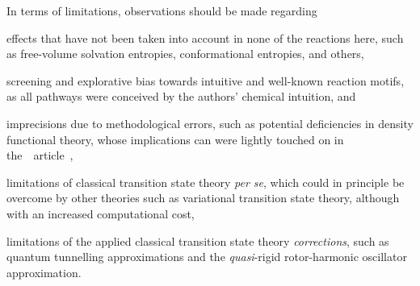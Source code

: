
In terms of limitations, observations should be made regarding
\begin{itemize*}
	\item effects that have not been taken into account in none of the reactions here,
	      such as free-volume solvation entropies, conformational entropies, and others,
	\item screening and explorative bias towards intuitive and well-known reaction motifs,
	      as all pathways were conceived by the authors' chemical intuition, and
	\item imprecisions due to methodological errors, such as potential deficiencies in density functional theory,
	      whose implications can were lightly touched on in the~\overreact{}~article~\cite{Schneider2022},
	\item limitations of classical transition state theory \emph{per se},
	      which could in principle be overcome by other theories such as variational transition state theory,
	      although with an increased computational cost,
	\item limitations of the applied classical transition state theory \emph{corrections},
	      such as quantum tunnelling approximations
	      and the \emph{quasi}-rigid rotor-harmonic oscillator approximation.
\end{itemize*}


